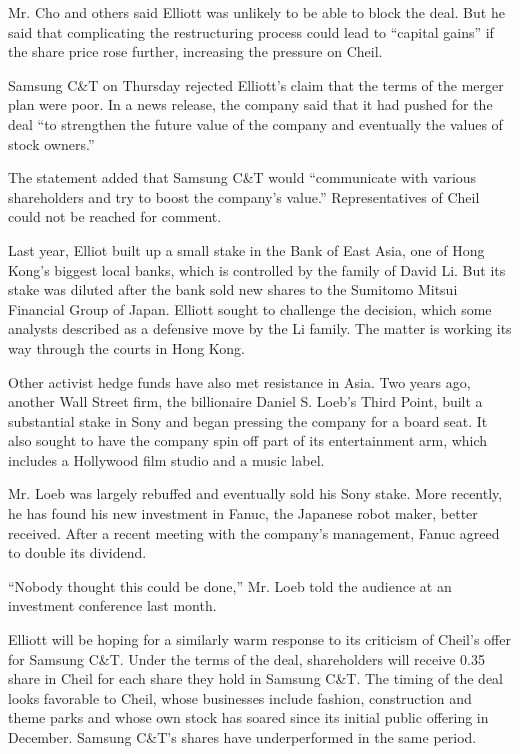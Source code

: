 Mr. Cho and others said Elliott was unlikely to be able to block the
deal. But he said that complicating the restructuring process could lead
to ``capital gains'' if the share price rose further, increasing the
pressure on Cheil.

Samsung C\&T on Thursday rejected Elliott's claim that the terms of the
merger plan were poor. In a news release, the company said that it had
pushed for the deal ``to strengthen the future value of the company and
eventually the values of stock owners.''

The statement added that Samsung C\&T would ``communicate with various
shareholders and try to boost the company's value.'' Representatives of
Cheil could not be reached for comment.

Last year, Elliot built up a small stake in the Bank of East Asia, one
of Hong Kong's biggest local banks, which is controlled by the family of
David Li. But its stake was diluted after the bank sold new shares to
the Sumitomo Mitsui Financial Group of Japan. Elliott sought to
challenge the decision, which some analysts described as a defensive
move by the Li family. The matter is working its way through the courts
in Hong Kong.

Other activist hedge funds have also met resistance in Asia. Two years
ago, another Wall Street firm, the billionaire Daniel S. Loeb's Third
Point, built a substantial stake in Sony and began pressing the company
for a board seat. It also sought to have the company spin off part of
its entertainment arm, which includes a Hollywood film studio and a
music label.

Mr. Loeb was largely rebuffed and eventually sold his Sony stake. More
recently, he has found his new investment in Fanuc, the Japanese robot
maker, better received. After a recent meeting with the company's
management, Fanuc agreed to double its dividend.

``Nobody thought this could be done,'' Mr. Loeb told the audience at an
investment conference last month.

Elliott will be hoping for a similarly warm response to its criticism of
Cheil's offer for Samsung C\&T. Under the terms of the deal,
shareholders will receive 0.35 share in Cheil for each share they hold
in Samsung C\&T. The timing of the deal looks favorable to Cheil, whose
businesses include fashion, construction and theme parks and whose own
stock has soared since its initial public offering in December. Samsung
C\&T's shares have underperformed in the same period.

